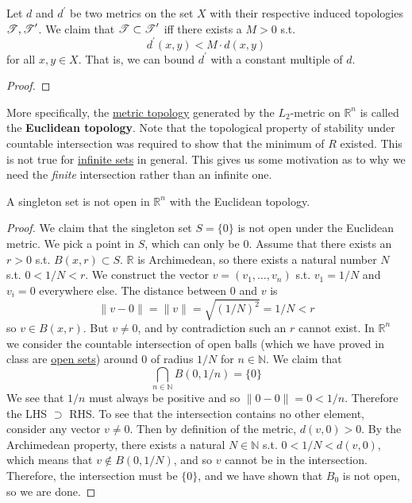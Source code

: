   \begin{lemma}
    \label{thm:fineness-of-metric-topologies}
    Let $d$ and $d^\prime$ be two metrics on the set $X$ with their respective induced topologies $\operatorname{\mathscr{T}}, \operatorname{\mathscr{T}}^\prime$. We claim that $\operatorname{\mathscr{T}} \subset \operatorname{\mathscr{T}}^\prime$ iff there exists a $M > 0$ s.t. 
    \begin{equation}
      d^\prime (x, y) < M \cdot d(x, y)
    \end{equation} 
    for all $x, y \in X$. That is, we can bound $d^\prime$ with a constant multiple of $d$. 
  \end{lemma}
  \begin{proof}
    
  \end{proof}

  More specifically, the \hyperref[def:metric-topology]{metric topology} generated by the $L_2$-metric on $\mathbb{R}^n$ is called the \textbf{Euclidean topology}. Note that the topological property of stability under countable intersection was required to show that the minimum of $R$ existed. This is not true for \hyperref[st-def:infinite-set]{infinite sets} in general. This gives us some motivation as to why we need the \textit{finite} intersection rather than an infinite one. 
  
  \begin{lemma}
    \label{thm:singletons-are-not-open-in-rn}
    A singleton set is not open in $\mathbb{R}^n$ with the Euclidean topology.   
  \end{lemma}
  \begin{proof}
    We claim that the singleton set $S = \{0\}$ is not open under the Euclidean metric. We pick a point in $S$, which can only be $0$. Assume that there exists an $r > 0$ s.t. $B(x, r) \subset S$. $\mathbb{R}$ is Archimedean, so there exists a natural number $N$ s.t. $0 < 1/N < r$. We construct the vector $v = (v_1, \ldots, v_n)$ s.t. $v_1 = 1/N$ and $v_i = 0$ everywhere else. The distance between $0$ and $v$ is 
    \begin{equation}
      \| v - 0 \| = \|v\| = \sqrt{(1/N)^2} = 1/N < r
    \end{equation} 
    so $v \in B(x, r)$. But $v \neq 0$, and by contradiction such an $r$ cannot exist. In $\mathbb{R}^n$ we consider the countable intersection of open balls (which we have proved in class are \hyperref[def:open-set]{open sets}) around $0$ of radius $1/N$ for $n \in \mathbb{N}$. We claim that 
    \begin{equation}
      \bigcap_{n \in \mathbb{N}} B(0, 1/n) = \{0\}
    \end{equation} 
    We see that $1/n$ must always be positive and so $\|0 - 0\| = 0 < 1/n$. Therefore the LHS $\supset $ RHS. To see that the intersection contains no other element, consider any vector $v \neq 0$. Then by definition of the metric, $d(v, 0) > 0$. By the Archimedean property, there exists a natural $N \in \mathbb{N}$ s.t. $0 < 1/N < d(v, 0)$, which means that $v \not\in B(0, 1/N)$, and so $v$ cannot be in the intersection. Therefore, the intersection must be $\{0\}$, and we have shown that $B_0$ is not open, so we are done. 
  \end{proof}


